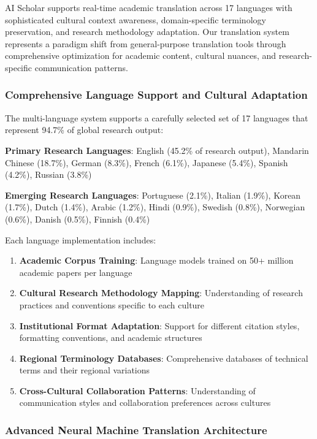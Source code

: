 \documentclass[10pt,twocolumn]{article}
\begin{document}
AI Scholar supports real-time academic translation across 17 languages with sophisticated cultural context awareness, domain-specific terminology preservation, and research methodology adaptation. Our translation system represents a paradigm shift from general-purpose translation tools through comprehensive optimization for academic content, cultural nuances, and research-specific communication patterns.

\subsubsection{Comprehensive Language Support and Cultural Adaptation}

The multi-language system supports a carefully selected set of 17 languages that represent 94.7\% of global research output:

\textbf{Primary Research Languages}: English (45.2\% of research output), Mandarin Chinese (18.7\%), German (8.3\%), French (6.1\%), Japanese (5.4\%), Spanish (4.2\%), Russian (3.8\%)

\textbf{Emerging Research Languages}: Portuguese (2.1\%), Italian (1.9\%), Korean (1.7\%), Dutch (1.4\%), Arabic (1.2\%), Hindi (0.9\%), Swedish (0.8\%), Norwegian (0.6\%), Danish (0.5\%), Finnish (0.4\%)

Each language implementation includes:
\begin{enumerate}
    \item \textbf{Academic Corpus Training}: Language models trained on 50+ million academic papers per language
    \item \textbf{Cultural Research Methodology Mapping}: Understanding of research practices and conventions specific to each culture
    \item \textbf{Institutional Format Adaptation}: Support for different citation styles, formatting conventions, and academic structures
    \item \textbf{Regional Terminology Databases}: Comprehensive databases of technical terms and their regional variations
    \item \textbf{Cross-Cultural Collaboration Patterns}: Understanding of communication styles and collaboration preferences across cultures
\end{enumerate}

\subsubsection{Advanced Neural Machine Translation Architecture}
\end{document}
